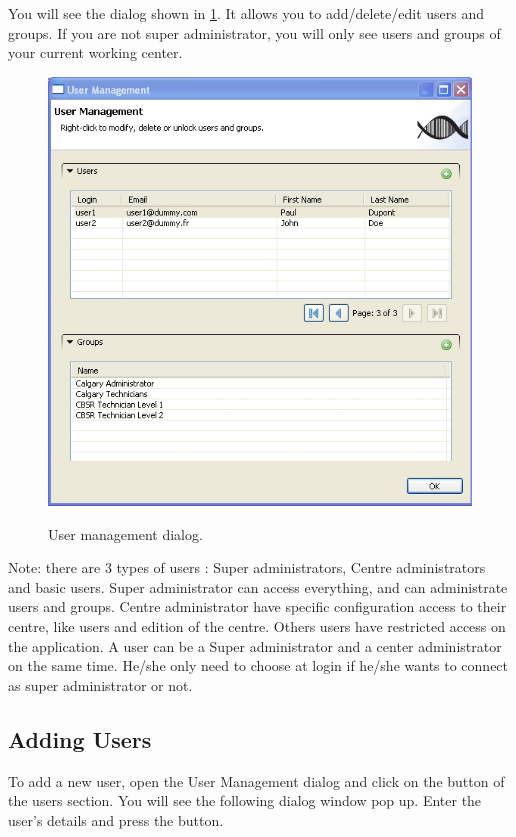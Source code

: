 You will see the dialog shown in \ref{fig:user_management}. It allows you to 
add/delete/edit users and groups. If you are not super administrator, you will 
only see users and groups of your current working center.
\begin{figure}[H]
  \centering
  \scalebox{0.5}
	   { \includegraphics*{screenshots/administration/user_management} }
	   \caption{User management dialog.}
	   \label{fig:user_management}
\end{figure}

Note: there are 3 types of users : Super administrators, Centre administrators 
and basic users. Super administrator can access everything, and can administrate users and groups.
Centre administrator have specific configuration access to their centre, like users and edition of the centre. Others users have restricted access on the application. A user can be a Super administrator 
and a center administrator on the same time. He/she only need to choose at login if he/she wants to connect as super administrator or not.

\subsection{Adding Users}
To add a new user, open the User Management dialog and click on the \fbox{+} button
of the users section. You will see the following dialog window pop up. Enter the 
user's details and press the  button.

